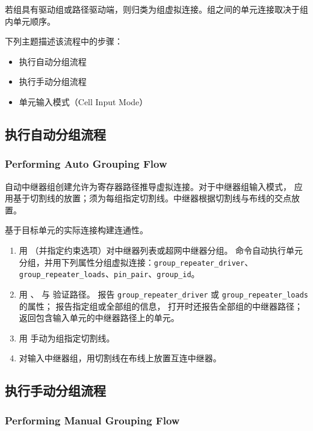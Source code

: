 若组具有驱动组或路径驱动端，则归类为组虚拟连接。组之间的单元连接取决于组内单元顺序。

下列主题描述该流程中的步骤：
\begin{itemize}
  \item 执行自动分组流程
  \item 执行手动分组流程
  \item 单元输入模式（Cell Input Mode）
\end{itemize}

\subsection{执行自动分组流程}
\subsubsection*{Performing Auto Grouping Flow}

自动中继器组创建允许为寄存器路径推导虚拟连接。对于中继器组输入模式， 应用基于切割线的放置；须为每组指定切割线。中继器根据切割线与布线的交点放置。

基于目标单元的实际连接构建连通性。
\begin{enumerate}
  \item 用 （并指定约束选项）对中继器列表或超网中继器分组。
  命令自动执行单元分组，并用下列属性分组虚拟连接：\texttt{group\_repeater\_driver}、\texttt{group\_repeater\_loads}、\texttt{pin\_pair}、\texttt{group\_id}。
  \item 用 、 与  验证路径。
   报告 \texttt{group\_repeater\_driver} 或 \texttt{group\_repeater\_loads} 的属性；
   报告指定组或全部组的信息， 打开时还报告全部组的中继器路径；
   返回包含输入单元的中继器路径上的单元。
  \item 用    手动为组指定切割线。
  \item 对输入中继器组，用切割线在布线上放置互连中继器。
\end{enumerate}

\subsection{执行手动分组流程}
\subsubsection*{Performing Manual Grouping Flow}

